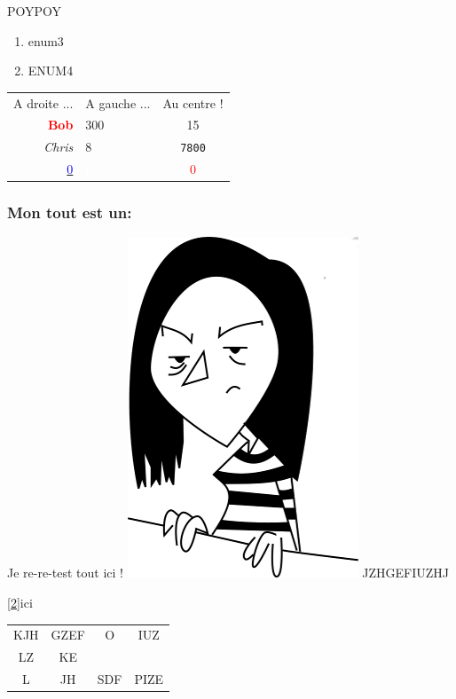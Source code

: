 \documentclass[10pt,a4paper]{report}
\begin{document}
POYPOY
\begin{enumerate}
\item enum3
\item ENUM4
\end{enumerate}
\begin{tabular}{rlc}
A droite ... & A gauche ... & Au centre ! \\
{\bf \textcolor{red}{Bob}} & 300 & 15 \\
{\itshape Chris} & 8 & \texttt{7800} \\
\underline{ \textcolor{blue}{0}} & \textcolor{white}{h} & \textcolor{red}{0} \\
\end{tabular}


\subsubsection{Mon tout est un:}
Je re-re-test tout ici !
\includegraphics{Mini_Amel.png}
JZHGEFIUZHJ

\ref{2}{ici}

\begin{tabular}{cccc}
KJH & GZEF & O & IUZ \\
LZ & KE & & \\
L & JH & SDF & PIZE \\
\end{tabular}
\end{document}
